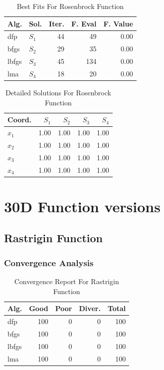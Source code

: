 \documentclass[conference]{IEEEtran}
\begin{document}
\begin{table}[H]
\centering
\caption{Best Fits For Rosenbrock Function}
\label{solutions:rosenbrock4d}
\begin{tabular}{llrrr}
\toprule
 Alg. &    Sol. &  Iter. &  F. Eval &  F. Value \\
\midrule
  dfp & $S_{1}$ &     44 &       49 &      0.00 \\
 bfgs & $S_{2}$ &     29 &       35 &      0.00 \\
lbfgs & $S_{3}$ &     45 &      134 &      0.00 \\
  lma & $S_{4}$ &     18 &       20 &      0.00 \\
\bottomrule
\end{tabular}
\end{table}

\begin{table}[H]
\centering
\caption{Detailed Solutions For Rosenbrock Function}
\label{detailedsolutions:rosenbrock4d}
\begin{tabular}{lrrrr}
\toprule
 Coord. &  $S_{1}$ &  $S_{2}$ &  $S_{3}$ &  $S_{4}$ \\
\midrule
$x_{1}$ &     1.00 &     1.00 &     1.00 &     1.00 \\
$x_{2}$ &     1.00 &     1.00 &     1.00 &     1.00 \\
$x_{3}$ &     1.00 &     1.00 &     1.00 &     1.00 \\
$x_{4}$ &     1.00 &     1.00 &     1.00 &     1.00 \\
\bottomrule
\end{tabular}
\end{table}


\section{30D Function versions}
\label{functions30D}

\subsection{Rastrigin Function}
\label{rastrigin30d30D}

\subsubsection{Convergence Analysis}
\label{convergencerastrigin30d30D}

\begin{table}[H]
\centering
\caption{Convergence Report For Rastrigin Function}
\label{convergence:rastrigin30d}
\begin{tabular}{lrrrr}
\toprule
 Alg. &  Good &  Poor &  Diver. &  Total \\
\midrule
  dfp &   100 &     0 &       0 &    100 \\
 bfgs &   100 &     0 &       0 &    100 \\
lbfgs &   100 &     0 &       0 &    100 \\
  lma &   100 &     0 &       0 &    100 \\
\bottomrule
\end{tabular}
\end{table}
\end{document}
